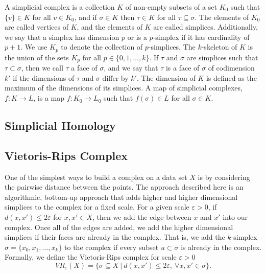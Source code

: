 \documentclass[letterpaper,titlepage]{article}
\begin{document}
    \begin{defn}
        A simplicial complex is a collection $K$ of non-empty subsets of a set $K_0$ such that $\{v\} \in K$ for all $v \in K_0$, and if $\sigma \in K$ then $\tau \in K$ for all $\tau \subseteq \sigma$. The elements of $K_0$ are called vertices of $K$, and the elements of $K$ are called simplices. Additionally, we say that a simplex has dimension $p$ or is a $p$-simplex if it has cardinality of $p+1$. We use $K_p$ to denote the collection of $p$-simplices. The $k$-skeleton of $K$ is the union of the sets $K_p$ for all $p \in \{0,1,\dots,k\}$. If $\tau$ and $\sigma$ are simplices such that $\tau \subset \sigma$, then we call $\tau$ a face of $\sigma$, and we say that $\tau$ is a face of $\sigma$ of codimension $k'$ if the dimensions of $\tau$ and $\sigma$ differ by $k'$. The dimension of $K$ is defined as the maximum of the dimensions of its simplices. A map of simplicial complexes, $f: K \to L$, is a map $f: K_0 \to L_0$ such that $f(\sigma) \in L$ for all $\sigma \in K$. \cite{Edelsbrunner}
    \end{defn}
    
\subsection{Simplicial Homology}

\subsection{Vietoris-Rips Complex} \label{rips}
One of the simplest ways to build a complex on a data set $X$ is by considering the pairwise distance between the points. The approach described here is an algorithmic, bottom-up approach that adds higher and higher dimensional simplices to the complex for a fixed scale. For a given scale $\varepsilon>0$, if $d(x,x')\leq 2\varepsilon$ for $x,x' \in X$, then we add the edge between $x$ and $x'$ into our complex. Once all of the edges are added, we add the higher dimensional simplices if their faces are already in the complex. That is, we add the $k$-simplex $\sigma = \{x_0,x_1,\dots,x_k\}$ to the complex if every subset $u \subset \sigma$ is already in the complex. Formally, we define the Vietoris-Rips complex \cite{Roadmap} for scale $\varepsilon>0$ 
$$VR_{\varepsilon}(X) = \{\sigma \subseteq X\ |\ d(x,x') \leq 2\varepsilon,\ \forall x,x' \in \sigma\}.$$
\end{document}
